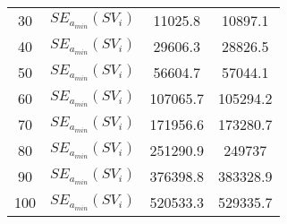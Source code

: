 \begin{table}[H]
\begin{tabular}{cc|cc}
		30                                                          & $SE_{a_{min}}(SV_i)$                     & 11025.8                      & 10897.1                      \\
		40                                                          & $SE_{a_{min}}(SV_i)$                     & 29606.3                      & 28826.5                      \\
		50                                                          & $SE_{a_{min}}(SV_i)$                     & 56604.7                      & 57044.1                      \\
		60                                                          & $SE_{a_{min}}(SV_i)$                     & 107065.7                     & 105294.2                     \\
		70                                                          & $SE_{a_{min}}(SV_i)$                     & 171956.6                     & 173280.7                     \\
		80                                                          & $SE_{a_{min}}(SV_i)$                     & 251290.9                     & 249737                       \\
		90                                                          & $SE_{a_{min}}(SV_i)$                     & 376398.8                     & 383328.9                 \\
		100                                                          & $SE_{a_{min}}(SV_i)$                     & 520533.3                     & 529335.7                   \\
	\end{tabular}
\end{table}

